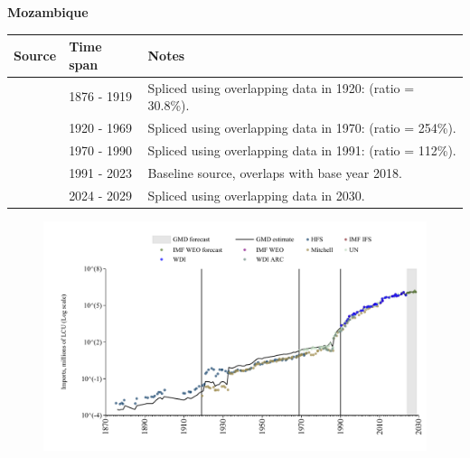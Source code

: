 \documentclass[12pt,a4paper,landscape]{article}
\begin{document}
\begin{adjustbox}{max totalsize={\paperwidth}{\paperheight},center}
\begin{minipage}[t][\textheight][t]{\textwidth}
\vspace*{0.5cm}
{}
\begin{center}
{\Large\bfseries Mozambique}
\end{center}
\vspace{0.5cm}
\begin{table}[H]
\centering
\small
\begin{tabular}{|l|l|l|}
\hline
\textbf{Source} & \textbf{Time span} & \textbf{Notes} \\
\hline
\rowcolor{white}\cite{HFS}& 1876 - 1919 &Spliced using overlapping data in 1920: (ratio = 30.8\%).\\
\rowcolor{lightgray}\cite{Mitchell}& 1920 - 1969 &Spliced using overlapping data in 1970: (ratio = 254\%).\\
\rowcolor{white}\cite{UN}& 1970 - 1990 &Spliced using overlapping data in 1991: (ratio = 112\%).\\
\rowcolor{lightgray}\cite{WDI}& 1991 - 2023 &Baseline source, overlaps with base year 2018.\\
\rowcolor{white}\cite{IMF_WEO_forecast}& 2024 - 2029 &Spliced using overlapping data in 2030.\\
\hline
\end{tabular}
\end{table}
\begin{figure}[H]
\centering
\includegraphics[width=\textwidth,height=0.6\textheight,keepaspectratio]{graphs/MOZ_imports.pdf}
\end{figure}
\end{minipage}
\end{adjustbox}
\end{document}
